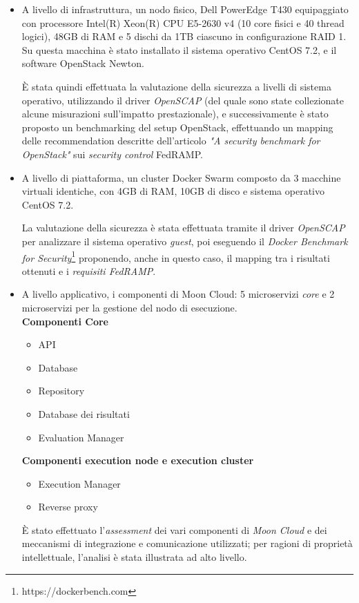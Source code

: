 \documentclass[../main.tex]{subfiles}
\begin{document}
\begin{itemize}
    \item A livello di infrastruttura, un nodo fisico, Dell PowerEdge T430 equipaggiato con processore Intel(R) Xeon(R) CPU E5-2630 v4 (10 core fisici e 40 thread logici), 48GB di RAM e 5 dischi da 1TB ciascuno in configurazione RAID 1. Su questa macchina è stato installato il sistema operativo CentOS 7.2, e il software OpenStack Newton.

        È stata quindi effettuata la valutazione della sicurezza a livelli di sistema operativo, utilizzando il driver \textit{OpenSCAP} (del quale sono state collezionate alcune misurazioni sull'impatto prestazionale), e successivamente è stato proposto un benchmarking del setup OpenStack, effettuando un mapping delle recommendation descritte dell'articolo \textit{"A security benchmark for OpenStack"}\cite{MyPaper} sui \textit{security control} FedRAMP.
    \item A livello di piattaforma, un cluster Docker Swarm composto da 3 macchine virtuali identiche, con 4GB di RAM, 10GB di disco e sistema operativo CentOS 7.2.
        
        La valutazione della sicurezza è stata effettuata tramite il driver \textit{OpenSCAP} per analizzare il sistema operativo \textit{guest}, poi eseguendo il \textit{Docker Benchmark for Security}\footnote{https://dockerbench.com} proponendo, anche in questo caso, il mapping tra i risultati ottenuti e i \textit{requisiti FedRAMP}.
        \vfill\newpage

    \item A livello applicativo, i componenti di Moon Cloud: 5 microservizi \textit{core} e 2 microservizi per la gestione del nodo di esecuzione.\\
        \textbf{Componenti Core}
        \begin{itemize}
            \item API
            \item Database
            \item Repository
            \item Database dei risultati
            \item Evaluation Manager
        \end{itemize}
        \textbf{Componenti execution node e execution cluster}
        \begin{itemize}
            \item Execution Manager
            \item Reverse proxy
        \end{itemize}

        È stato effettuato l'\textit{assessment} dei vari componenti di \textit{Moon Cloud} e dei meccanismi di integrazione e comunicazione utilizzati; per ragioni di proprietà intellettuale, l'analisi è stata illustrata ad alto livello.
\end{itemize}
\end{document}
